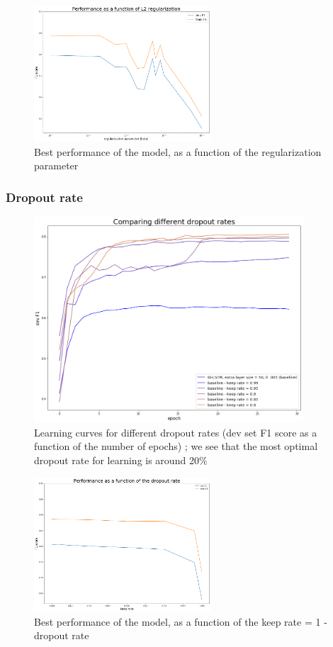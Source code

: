 \documentclass{article} %
\begin{document}
\begin{figure}
\begin{center}
\includegraphics[width=250px]{figs/l2_graph.png}
\caption{Best performance of the model, as a function of the regularization parameter}
\label{l2_graph}
\end{center}
\end{figure}

\subsubsection{Dropout rate}

\begin{figure}
\begin{center}
\includegraphics[width=380px]{figs/dr_devf1.png}
\caption{Learning curves for different dropout rates (dev set F1 score as a function of the number of epochs) ; we see that the most optimal dropout rate for learning is around 20\%}
\label{dr_devf1}
\end{center}
\end{figure}

\begin{figure}
\begin{center}
\includegraphics[width=250px]{figs/dr_graph.png}
\caption{Best performance of the model, as a function of the keep rate = 1 - dropout rate}
\label{dr_graph}
\end{center}
\end{figure}
\end{document}
